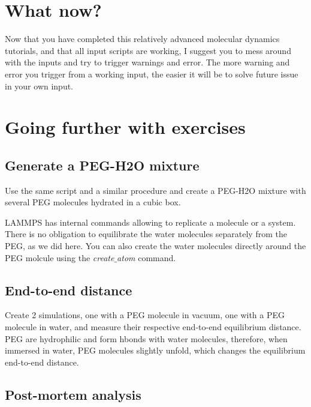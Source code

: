 \section{What now?}

\noindent Now that you have completed this relatively advanced molecular dynamics tutorials, and 
that all input scripts are working, I suggest you to mess around with the inputs and 
try to trigger warnings and error. The more warning and error you trigger from a working input, the 
easier it will be to solve future issue in your own input. 

\section{Going further with exercises}

\noindent \subsection{Generate a PEG-H2O mixture}

Use the same script and a similar procedure and create a
PEG-H2O mixture with several PEG molecules hydrated in a
cubic box.

\begin{tcolorbox}[colback=mylightblue!5!white,colframe=mylightblue!75!black,title=Hints]
LAMMPS has internal commands allowing to replicate
a molecule or a system.
There is no obligation to equilibrate the water molecules separately from the PEG,
as we did here. You can also create the water molecules directly around the PEG molcule
using the \textit{create$\_$atom} command.
\end{tcolorbox}

\noindent \subsection{End-to-end distance}

Create 2 simulations, one with a PEG molecule in vacuum, one
with a PEG molecule in water, and measure their respective
end-to-end equilibrium distance. PEG are hydrophilic and
form hbonds with water molecules, therefore, when immersed
in water, PEG molecules slightly unfold, which changes the
equilibrium end-to-end distance.

\subsection{Post-mortem analysis}

